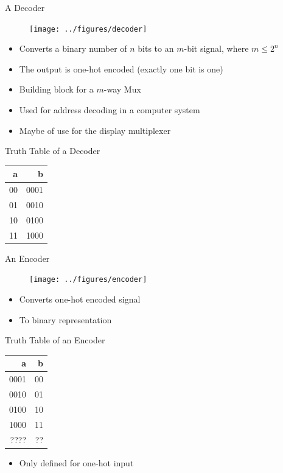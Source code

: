 \begin{frame}[fragile]{A Decoder}
\begin{figure}
  \texttt{[image: ../figures/decoder]}
\end{figure}
\begin{itemize}
\item Converts a binary number of $n$ bits to an $m$-bit signal, where $m \leq 2^n$
\item The output is one-hot encoded (exactly one bit is one)
\item Building block for a $m$-way Mux
\item Used for address decoding in a computer system
\item Maybe of use for the display multiplexer
\end{itemize}
\end{frame}

\begin{frame}[fragile]{Truth Table of a Decoder}
\begin{table}
  \begin{tabular}{rr}
    \toprule
    a & b \\
    \midrule
    00 & 0001 \\
    01 & 0010 \\
    10 & 0100 \\
    11 & 1000 \\
    \bottomrule 
  \end{tabular} 
\end{table}
\end{frame}

\begin{frame}[fragile]{An Encoder}
\begin{figure}
  \texttt{[image: ../figures/encoder]}
\end{figure}
\begin{itemize}
\item Converts one-hot encoded signal
\item To binary representation
\end{itemize}
\end{frame}

\begin{frame}[fragile]{Truth Table of an Encoder}
\begin{table}
  \begin{tabular}{rr}
    \toprule
    a & b \\
    \midrule
    0001 & 00 \\
    0010 & 01 \\
    0100 & 10 \\
    1000 & 11 \\
    ???? & ?? \\
    \bottomrule 
  \end{tabular} 
\end{table}
\begin{itemize}
\item Only defined for one-hot input
\end{itemize}
\end{frame}

